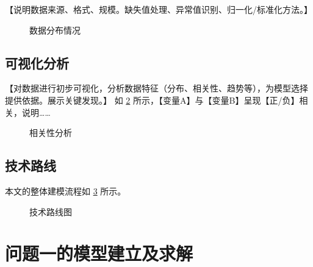 \documentclass[withoutpreface,bwprint]{cumcmthesis}
\begin{document}
【说明数据来源、格式、规模。缺失值处理、异常值识别、归一化/标准化方法。】

\begin{figure}[H]
    \centering
    \caption{数据分布情况}
    \label{fig:data_dist}
\end{figure}

\subsection{可视化分析}

【对数据进行初步可视化，分析数据特征（分布、相关性、趋势等），为模型选择提供依据。展示关键发现。】
如 \cref{fig:correlation} 所示，【变量A】与【变量B】呈现【正/负】相关，说明……

\begin{figure}[H]
    \centering
    \caption{相关性分析}
    \label{fig:correlation}
\end{figure}

\subsection{技术路线}

本文的整体建模流程如 \cref{fig:flowchart} 所示。

\begin{figure}[H]
    \centering
    \caption{技术路线图}
    \label{fig:flowchart}
\end{figure}

\section{问题一的模型建立及求解}
\end{document}
